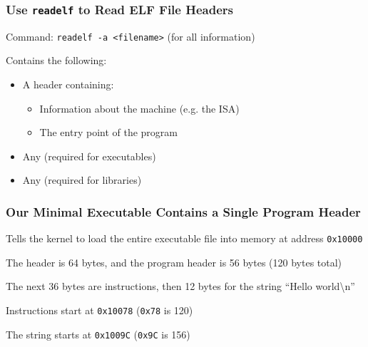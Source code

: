   \begin{frame}
    \frametitle{Use \texttt{readelf} to Read ELF File Headers}

    Command: \hspace{0.5em} \texttt{readelf -a <filename>} (for all information)

    \vspace{1em}

    Contains the following:
    \begin{itemize}
      \item A header containing:
      \begin{itemize}
        \item Information about the machine (e.g. the ISA)
        \item The entry point of the program
      \end{itemize}
      \item Any  (required for executables)
      \item Any  (required for libraries)
    \end{itemize}
  \end{frame}

  \begin{frame}
    \frametitle{Our Minimal Executable Contains a Single Program Header}

    Tells the kernel to load the entire executable file into memory at
    address \texttt{0x10000}

    \vspace{2em}

    The header is 64 bytes, and the program header is 56 bytes (120 bytes total)

    \vspace{2em}

    The next 36 bytes are instructions, then 12 bytes for the string ``Hello
    world\textbackslash n''

    \vspace{1em}

    \hspace{2em} Instructions start at \texttt{0x10078} (\texttt{0x78} is 120)

    \vspace{1em}

    \hspace{2em} The string starts at \texttt{0x1009C} (\texttt{0x9C} is 156)
  \end{frame}


